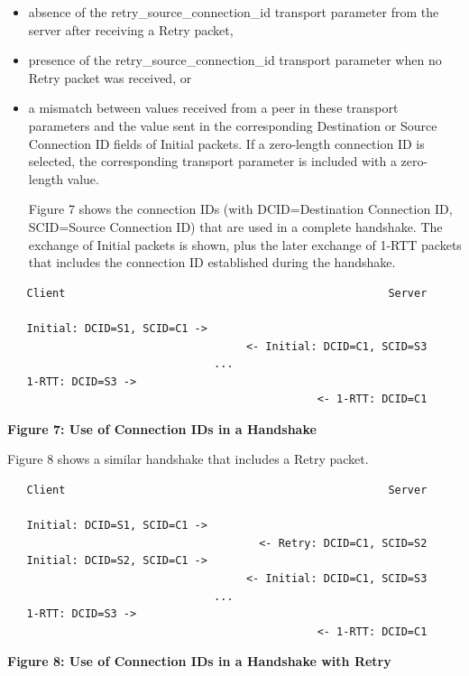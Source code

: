 \documentclass{article}
\begin{document}
\begin{itemize}
\item absence of the retry\_source\_connection\_id transport parameter from the server after receiving a Retry packet,
\item presence of the retry\_source\_connection\_id transport parameter when no Retry packet was received, or
\item a mismatch between values received from a peer in these transport parameters and the value sent in the corresponding Destination or Source Connection ID fields of Initial packets.
If a zero-length connection ID is selected, the corresponding transport parameter is included with a zero-length value.

Figure 7 shows the connection IDs (with DCID=Destination Connection ID, SCID=Source Connection ID) that are used in a complete handshake. The exchange of Initial packets is shown, plus the later exchange of 1-RTT packets that includes the connection ID established during the handshake.

\end{itemize}
\begin{verbatim}
   Client                                                  Server

   Initial: DCID=S1, SCID=C1 ->
                                     <- Initial: DCID=C1, SCID=S3
                                ...
   1-RTT: DCID=S3 ->
                                                <- 1-RTT: DCID=C1

\end{verbatim}

\begin{center}
\textbf{Figure 7: Use of Connection IDs in a Handshake}
\end{center}

Figure 8 shows a similar handshake that includes a Retry packet.

\begin{verbatim}
   Client                                                  Server

   Initial: DCID=S1, SCID=C1 ->
                                       <- Retry: DCID=C1, SCID=S2
   Initial: DCID=S2, SCID=C1 ->
                                     <- Initial: DCID=C1, SCID=S3
                                ...
   1-RTT: DCID=S3 ->
                                                <- 1-RTT: DCID=C1

\end{verbatim}

\begin{center}
\textbf{Figure 8: Use of Connection IDs in a Handshake with Retry}
\end{center}
\end{document}

